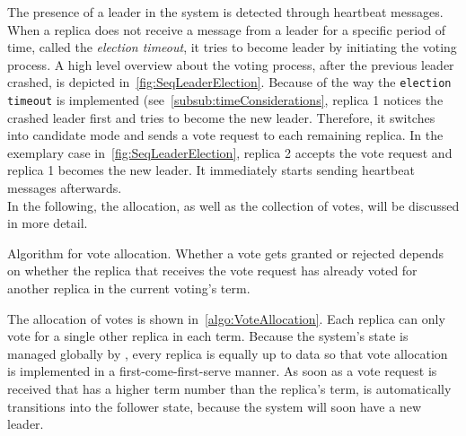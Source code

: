 The presence of a leader in the system is detected through heartbeat messages.
When a replica does not receive a message from a leader for a specific period of time, called the \textit{election timeout}, it tries to become leader by initiating the voting process.
A high level overview about the voting process, after the previous leader crashed, is depicted in~\autoref{fig:SeqLeaderElection}.
Because of the way the \texttt{election timeout} is implemented (see~\autoref{subsub:timeConsiderations}, replica 1 notices the crashed leader first and tries to become the new leader.
Therefore, it switches into candidate mode and sends a vote request to each remaining replica.
In the exemplary case in~\autoref{fig:SeqLeaderElection}, replica 2 accepts the vote request and replica 1 becomes the new leader.
It immediately starts sending heartbeat messages afterwards.
\\
In the following, the allocation, as well as the collection of votes, will be discussed in more detail.
\\
\begin{algorithm}[H]\caption{Algorithm for vote allocation. Whether a vote gets granted or rejected depends on whether the replica that receives the vote request has already voted for another replica in the current voting's term.}\label{algo:VoteAllocation}

\BlankLine
{}
\end{algorithm}

The allocation of votes is shown in~\autoref{algo:VoteAllocation}.
Each replica can only vote for a single other replica in each term.
Because the system's state is managed globally by , every replica is equally up to data so that vote allocation is implemented in a first-come-first-serve manner.
As soon as a vote request is received that has a higher term number than the replica's term, is automatically transitions into the follower state, because the system will soon have a new leader.

